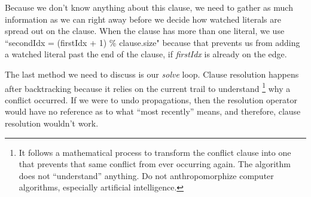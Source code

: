 \documentclass[../main.tex]{subfiles}
\begin{document}
Because we don't know anything about this clause, we need to gather as much 
information as we can right away before we decide how watched literals are 
spread out on the clause. When the clause has more than one literal, we 
use ``secondIdx = (firstIdx + 1) \% clause.size" because that prevents us 
from adding a watched literal past the end of the clause, if \textit{firstIdx}
is already on the edge.

The last method we need to discuss is our \textit{solve} loop. Clause 
resolution happens after backtracking because it relies on the current 
trail to understand
\footnote{It follows a mathematical process to transform the conflict clause 
into one that prevents that same conflict from ever occurring again. The 
algorithm does not ``understand'' anything. Do not anthropomorphize computer 
algorithms, especially artificial intelligence.}
why a conflict occurred. If we were to undo propagations, then the resolution 
operator would have no reference as to what ``most recently'' means, and 
therefore, clause resolution wouldn't work.
\end{document}
